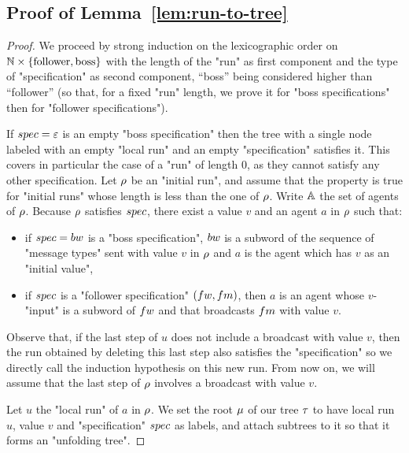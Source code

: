 \subsection{Proof of Lemma~\ref{lem:run-to-tree}}

\LemRunToTree*

\begin{proof}
	
	We proceed by strong induction on the lexicographic order on $\mathbb{N} \times \{\text{follower}, \text{boss}\}$ with the length of the "run" as first component and the type of "specification" as second component, ``boss'' being considered higher than ``follower'' (so that, for a fixed "run" length, we prove it for "boss specifications" then for "follower specifications"). 
	
	If $\spec = \epsilon$ is an empty "boss specification" then the tree with a single node labeled with an empty "local run" and an empty "specification" satisfies it.
	This covers in particular the case of a "run" of length $0$, as they cannot satisfy any other specification.
	Let $\rho$ be an "initial run", and assume that the property is true for "initial runs" whose length is less than the one of $\rho$. Write $\mathbb{A}$ the set of agents of $\rho$.
	Because $\rho$ satisfies $\spec$, there exist a value $v$ and an agent $a$ in $\rho$ such that:
	\begin{itemize}
	\item if $\spec= \bossspec$ is a "boss specification", $\bossspec$ is a subword of the sequence of "message types" sent with value $v$ in $\rho$ and $a$ is the agent which has $v$ as an "initial value",
	\item if $\spec$ is a "follower specification" $(\followwordspec, \followmessagespec)$, then $a$ is an agent whose $v$-"input" is a subword of $\followwordspec$ and that broadcasts $\followmessagespec$ with value $v$. 
	\end{itemize}

	Observe that, if the last step of $u$ does not include a broadcast with value $v$, then the run obtained by deleting this last step also satisfies the "specification" so we directly call the induction hypothesis on this new run. From now on, we will assume that the last step of $\rho$ involves a broadcast with value $v$. 

	Let $u$ the "local run" of $a$ in $\rho$. We set the root $\mu$ of our tree $\tau$ to have local run $u$, value $v$ and "specification" $\spec$ as labels, and attach subtrees to it so that it forms an "unfolding tree".


\end{proof}
